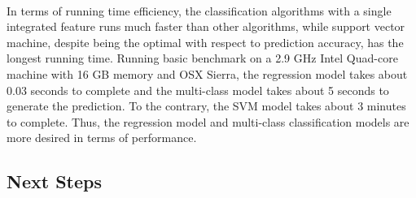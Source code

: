 \documentclass[12pt]{article}
\begin{document}
\paragraph{}
In terms of running time efficiency, the classification algorithms with a single integrated feature runs much faster than other algorithms, while support vector machine, despite being the optimal with respect to prediction accuracy, has the longest running time. Running basic benchmark on a 2.9 GHz Intel Quad-core machine with 16 GB memory and OSX Sierra, the regression model takes about 0.03 seconds to complete and the multi-class model takes about 5 seconds to generate the prediction. To the contrary, the SVM model takes about 3 minutes to complete. Thus, the regression model and multi-class classification models are more desired in terms of performance.

\subsection{Next Steps}
\end{document}
